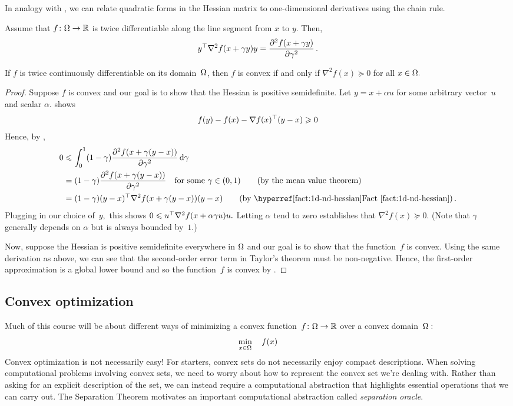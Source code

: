 In analogy with , we can relate quadratic forms in the
Hessian matrix to one-dimensional derivatives using the chain rule.
\begin{fact}
Assume that $f\colon\Omega\to\mathbb{R}$ is twice differentiable along the line segment from $x$ to $y.$ Then,
\[
y^\top \nabla^2f(x+\gamma y)y 
= \frac{\partial^2f(x+\gamma y)}{\partial\gamma^2}\,.
\]
\end{fact}

\begin{proposition}
If $f$ is twice continuously differentiable on its domain~$\Omega$, then $f$ is convex if and only if $\nabla^2 f(x)\succeq 0$ for all $x\in\Omega.$ 
\end{proposition}
\begin{proof}
Suppose $f$ is convex and our goal is to show that the Hessian is positive semidefinite. 
Let $y=x + \alpha u$ for some arbitrary vector~$u$ and scalar $\alpha.$
 shows
\[
f(y) - f(x) -\nabla f(x)^\top (y-x) \geqslant 0
\]
Hence, by ,
\begin{align*}
0&\le  \int_0^1 (1-\gamma)\frac{\partial^2 f(x+\gamma(y-x))}{\partial\gamma^2}\rd\gamma\\
&=  (1-\gamma)\frac{\partial^2 f(x+\gamma(y-x))}{\partial\gamma^2}
\quad\text{for some $\gamma\in(0,1)$} \tag{by the mean value theorem}\\
&= (1-\gamma)(y-x)^\trans \nabla^2 f(x+\gamma (y-x))(y-x) 
\tag{by \factref{1d-nd-hessian}}\,.
\end{align*}
Plugging in our choice of~$y,$ this shows $0\leqslant u^\top \nabla^2
f(x+\alpha\gamma u)u.$ Letting $\alpha$ tend to zero establishes that $\nabla^2
f(x)\succeq 0.$ (Note that $\gamma$ generally depends on $\alpha$ but is always
bounded by~$1.$)

Now, suppose the Hessian is positive semidefinite everywhere in $\Omega$ and
our goal is to show that  the function~$f$ is convex.  Using the same derivation
as above, we can see that the second-order error term in Taylor's theorem must
be non-negative. Hence, the first-order approximation is
a global lower bound and so the function~$f$ is convex by
.
\end{proof}

\subsection{Convex optimization}
Much of this course will be about different ways of minimizing a convex function~$f\colon\Omega\to\mathbb{R}$ over a convex domain~$\Omega:$ 
\[
\min_{x\in\Omega}\quad f(x)
\]
Convex optimization is not necessarily easy! 
For starters, convex sets do not necessarily enjoy compact descriptions. When solving computational problems involving convex sets, we need to worry about how to represent the convex set we're dealing with. Rather than asking for an explicit description of the set, we can instead require a computational abstraction that highlights essential operations that we can carry out. The Separation Theorem motivates an important computational abstraction called \emph{separation oracle}.

